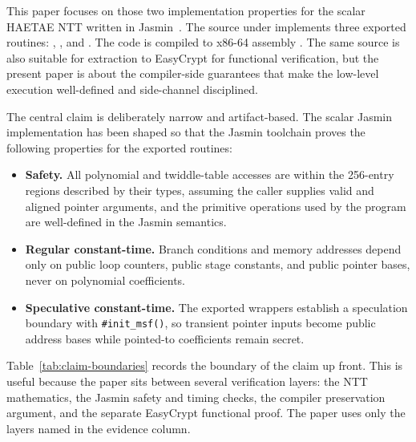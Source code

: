 \documentclass[10pt,twocolumn]{article}
\newcommand{\haetae}{HAETAE}
\newcommand{\jasmin}{Jasmin}
\newcommand{\ct}{constant-time}
\begin{document}
This paper focuses on those two implementation properties for the scalar
\haetae{} NTT written in \jasmin{}~\cite{Jasmin2017,LastMile2020,JasminFramework2026}.
The source under
 implements three exported routines:
, , and
.  The code is compiled to x86-64 assembly
.  The same source is also suitable for extraction to EasyCrypt
for functional verification, but the present paper is about the compiler-side
guarantees that make the low-level execution well-defined and side-channel
disciplined.

The central claim is deliberately narrow and artifact-based.  The scalar
\jasmin{} implementation has been shaped so that the \jasmin{} toolchain proves
the following properties for the exported routines:
\begin{itemize}
  \item \textbf{Safety.}  All polynomial and twiddle-table accesses are within
        the 256-entry regions described by their types, assuming the caller
        supplies valid and aligned pointer arguments, and the primitive
        operations used by the program are well-defined in the \jasmin{}
        semantics.
  \item \textbf{Regular \ct{}.}  Branch conditions and memory addresses depend
        only on public loop counters, public stage constants, and public pointer
        bases, never on polynomial coefficients.
  \item \textbf{Speculative \ct{}.}  The exported wrappers establish a
        speculation boundary with \texttt{\#init\_msf()}, so transient pointer
        inputs become public address bases while pointed-to coefficients remain
        secret.
\end{itemize}

Table~\ref{tab:claim-boundaries} records the boundary of the claim up front.
This is useful because the paper sits between several verification layers: the
NTT mathematics, the \jasmin{} safety and timing checks, the compiler
preservation argument, and the separate EasyCrypt functional proof.  The paper
uses only the layers named in the evidence column.
\end{document}
